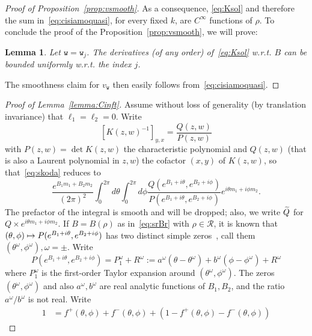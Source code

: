 \documentclass[10pt]{amsart}
\newtheorem{lemm}[theo]{Lemma}\newtheorem{prop}[theo]{Proposition}\newtheorem{coro}[theo]{Corollary}\newtheorem{conj}[theo]{Conjecture}
\theoremstyle{definition}\newtheorem{defi}[theo]{Definition}\newtheorem{rema}[theo]{Remark}\newtheorem{exam}[theo]{Example}\newtheorem{exem}[theo]{Example}\newtheorem{nota}[theo]{Notation}
\newcommand{\ttw}{\mathtt{w}}
\newcommand{\clR}{\mathcal{R}}
\let\oldtilde\tilde
\renewcommand*{\tilde}[1]{\mathchoice{\widetilde{#1}}{\widetilde{#1}}{\oldtilde{#1}}{\oldtilde{#1}}}
\begin{document}
\begin{proof}[{Proof of Proposition~\ref{prop:vsmooth}}]
As a consequence, \eqref{eq:Ksol} and therefore the sum in~\eqref{eq:cisiamoquasi}, for every fixed $k$, are $C^\infty$ functions of $\rho$. To conclude the proof of the Proposition~\ref{prop:vsmooth}, we will prove:
\begin{lemm}\label{lemma:GK}
Let $\ttw=\ttw_j$. The derivatives (of any order) of~\eqref{eq:Ksol} w.r.t. $B$ can be bounded uniformly w.r.t. the index $j$.
\end{lemm}

The smoothness claim for $v_{\ttw}$ then easily follows from~\eqref{eq:cisiamoquasi}.
\end{proof}

\begin{proof}[{Proof of Lemma~\ref{lemma:Cinft}}]
Assume without loss of generality (by translation invariance) that $\ell_1=\ell_2=0$. Write
\begin{equation}
\left[K(z,w)^{-1}\right]_{y,x}=\frac{Q(z,w)}{P(z,w)}
\end{equation}
with $P(z,w)=\det K(z,w)$ the characteristic polynomial and $Q(z,w)$ (that is also a Laurent polynomial in $z,w$) the cofactor $(x,y)$ of $K(z,w)$, so that~\eqref{eq:skoda} reduces to
\begin{equation}
\frac{e^{B_1 m_1+B_2 m_2}}{(2\pi)^2}\int_0^{2\pi} d\theta \int_0^{2\pi} d \phi \frac{Q\left(e^{B_1+i\theta},e^{B_2+i\phi}\right)}{P\left(e^{B_1+i\theta},e^{B_2+i\phi}\right)}e^{i \theta m_1+i\phi m_2}.
\end{equation}
The prefactor of the integral is smooth and will be dropped; also, we write $\tilde Q$ for $Q\times e^{i \theta m_1+i\phi m_2}$. If $B=B(\rho)$ as in~\eqref{eq:srBr} with $\rho\in\clR$, it is known that $(\theta,\phi)\linebreak\mapsto P(e^{B_1+i\theta},e^{B_2+i\phi})$ has two distinct simple zeros~\cite{KOS03}, call them $(\theta^\omega,\phi^\omega),\omega=\pm$. Write
\begin{equation}
P\left(e^{B_1+i\theta},e^{B_2+i\phi}\right)=P^\omega_1+R^\omega:=a^\omega\left(\theta-\theta^\omega\right)+b^\omega\left(\phi-\phi^\omega\right)+R^\omega
\end{equation}
where $P^\omega_1$ is the first-order Taylor expansion around $(\theta^\omega,\phi^\omega)$. The zeros $(\theta^\omega,\phi^\omega)$ and also $a^\omega,b^\omega$ are real analytic functions of $B_1,B_2$, and the ratio $a^\omega/b^\omega$ is not real. Write
\begin{align}
1 &=f^+(\theta,\phi)+f^-(\theta,\phi)+\left(1-f^+(\theta,\phi)-f^-(\theta,\phi)\right)

\end{align}
\end{proof}
\end{document}
